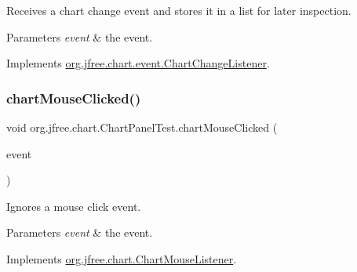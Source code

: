 Receives a chart change event and stores it in a list for later inspection.


\begin{DoxyParams}{Parameters}
{\em event} & the event. \\
\hline
\end{DoxyParams}


Implements \mbox{\hyperlink{interfaceorg_1_1jfree_1_1chart_1_1event_1_1_chart_change_listener_ac4ad92c4f9cc7be26964dab79d882bee}{org.\+jfree.\+chart.\+event.\+Chart\+Change\+Listener}}.

\mbox{\label{classorg_1_1jfree_1_1chart_1_1_chart_panel_test_a8c56580e9af6f212e2b587673913be07}} 
\subsubsection{\texorpdfstring{chart\+Mouse\+Clicked()}{chartMouseClicked()}}
{\footnotesize\ttfamily void org.\+jfree.\+chart.\+Chart\+Panel\+Test.\+chart\+Mouse\+Clicked (\begin{DoxyParamCaption}\item[{\mbox{\hyperlink{classorg_1_1jfree_1_1chart_1_1_chart_mouse_event}{Chart\+Mouse\+Event}}}]{event }\end{DoxyParamCaption})}

Ignores a mouse click event.


\begin{DoxyParams}{Parameters}
{\em event} & the event. \\
\hline
\end{DoxyParams}


Implements \mbox{\hyperlink{interfaceorg_1_1jfree_1_1chart_1_1_chart_mouse_listener_afa372155dc6454a3fbfb0b5118b15f39}{org.\+jfree.\+chart.\+Chart\+Mouse\+Listener}}.

\mbox{\label{classorg_1_1jfree_1_1chart_1_1_chart_panel_test_af9a45698f4c232b2b9ff6fe9dd450c79}} 
